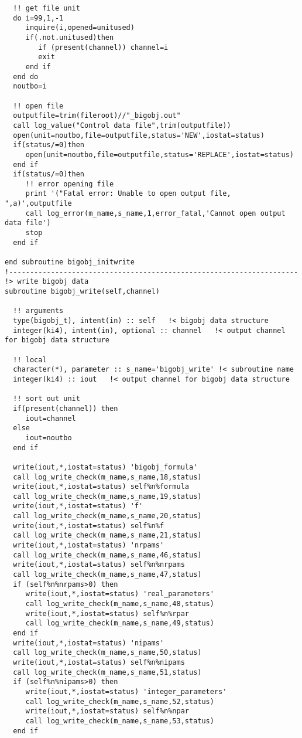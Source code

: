 \begin{verbatim}
  !! get file unit
  do i=99,1,-1
     inquire(i,opened=unitused)
     if(.not.unitused)then
        if (present(channel)) channel=i
        exit
     end if
  end do
  noutbo=i

  !! open file
  outputfile=trim(fileroot)//"_bigobj.out"
  call log_value("Control data file",trim(outputfile))
  open(unit=noutbo,file=outputfile,status='NEW',iostat=status)
  if(status/=0)then
     open(unit=noutbo,file=outputfile,status='REPLACE',iostat=status)
  end if
  if(status/=0)then
     !! error opening file
     print '("Fatal error: Unable to open output file, ",a)',outputfile
     call log_error(m_name,s_name,1,error_fatal,'Cannot open output data file')
     stop
  end if

end subroutine bigobj_initwrite
!---------------------------------------------------------------------
!> write bigobj data
subroutine bigobj_write(self,channel)

  !! arguments
  type(bigobj_t), intent(in) :: self   !< bigobj data structure
  integer(ki4), intent(in), optional :: channel   !< output channel for bigobj data structure

  !! local
  character(*), parameter :: s_name='bigobj_write' !< subroutine name
  integer(ki4) :: iout   !< output channel for bigobj data structure

  !! sort out unit
  if(present(channel)) then
     iout=channel
  else
     iout=noutbo
  end if

  write(iout,*,iostat=status) 'bigobj_formula'
  call log_write_check(m_name,s_name,18,status)
  write(iout,*,iostat=status) self%n%formula
  call log_write_check(m_name,s_name,19,status)
  write(iout,*,iostat=status) 'f'
  call log_write_check(m_name,s_name,20,status)
  write(iout,*,iostat=status) self%n%f
  call log_write_check(m_name,s_name,21,status)
  write(iout,*,iostat=status) 'nrpams'
  call log_write_check(m_name,s_name,46,status)
  write(iout,*,iostat=status) self%n%nrpams
  call log_write_check(m_name,s_name,47,status)
  if (self%n%nrpams>0) then
     write(iout,*,iostat=status) 'real_parameters'
     call log_write_check(m_name,s_name,48,status)
     write(iout,*,iostat=status) self%n%rpar
     call log_write_check(m_name,s_name,49,status)
  end if
  write(iout,*,iostat=status) 'nipams'
  call log_write_check(m_name,s_name,50,status)
  write(iout,*,iostat=status) self%n%nipams
  call log_write_check(m_name,s_name,51,status)
  if (self%n%nipams>0) then
     write(iout,*,iostat=status) 'integer_parameters'
     call log_write_check(m_name,s_name,52,status)
     write(iout,*,iostat=status) self%n%npar
     call log_write_check(m_name,s_name,53,status)
  end if


\end{verbatim}
